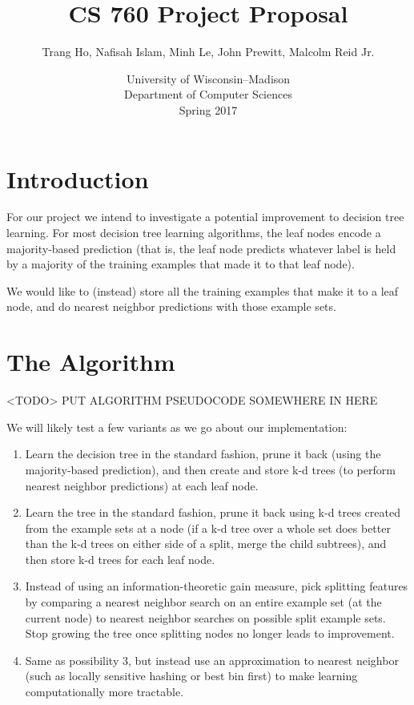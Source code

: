 \documentclass[10pt]{article}
\title{CS 760 Project Proposal}
\author{Trang Ho, Nafisah Islam, Minh Le, John Prewitt, Malcolm Reid Jr.}
\date{University of Wisconsin--Madison\\Department of Computer Sciences\\Spring 2017}
\begin{document}
\setlength{\baselineskip}{18pt}
\maketitle

\section{Introduction}
For our project we intend to investigate a potential improvement to decision tree learning. For most decision tree learning algorithms, the leaf nodes encode a majority-based prediction (that is, the leaf node predicts whatever label is held by a majority of the training examples that made it to that leaf node).  

We would like to (instead) store all the training examples that make it to a leaf node, and do nearest neighbor predictions with those example sets.

\section{The Algorithm}

<TODO> PUT ALGORITHM PSEUDOCODE SOMEWHERE IN HERE

We will likely test a few variants as we go about our implementation:

\begin{enumerate}
	\item Learn the decision tree in the standard fashion, prune it back (using the majority-based prediction), and then create and store k-d trees (to perform nearest neighbor predictions) at each leaf node.
	\item Learn the tree in the standard fashion, prune it back using k-d trees created from the example sets at a node (if a k-d tree over a whole set does better than the k-d trees on either side of a split, merge the child subtrees), and then store k-d trees for each leaf node. 
	\item Instead of using an information-theoretic gain measure, pick splitting features by comparing a nearest neighbor search on an entire example set (at the current node) to nearest neighbor searches on possible split example sets.  Stop growing the tree once splitting nodes no longer leads to improvement.
	\item Same as possibility 3, but instead use an approximation to nearest neighbor (such as locally sensitive hashing or best bin first) to make learning computationally more tractable.

\end{enumerate}
\end{document}
